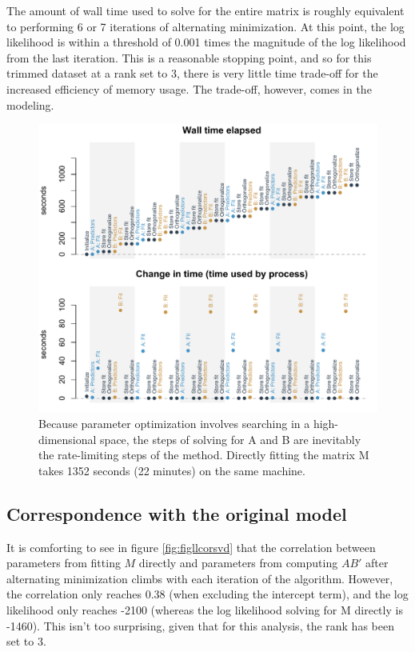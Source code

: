 \documentclass[12pt,twoside]{mitthesis-manusdown}
\begin{document}
The amount of wall time used to solve for the entire matrix is roughly
equivalent to performing 6 or 7 iterations of alternating minimization.
At this point, the log likelihood is within a threshold of 0.001 times
the magnitude of the log likelihood from the last iteration. This is a
reasonable stopping point, and so for this trimmed dataset at a rank set
to 3, there is very little time trade-off for the increased efficiency
of memory usage. The trade-off, however, comes in the modeling.
\begin{figure}[tb!]

{\centering \includegraphics[width=0.8\linewidth]{figurespred/figTimePointStore} 

}

\caption{\label{fig:figTimePointStore}Because parameter optimization involves searching in a high-dimensional space, the steps of solving for A and B are inevitably the rate-limiting steps of the method. Directly fitting the matrix M takes 1352 seconds (22 minutes) on the same machine.}\label{fig:figTimePointStore}
\end{figure}
\subsection{Correspondence with the original
model}\label{correspondence-with-the-original-model}

It is comforting to see in figure \ref{fig:figllcorsvd} that the
correlation between parameters from fitting \(M\) directly and
parameters from computing \(AB'\) after alternating minimization climbs
with each iteration of the algorithm. However, the correlation only
reaches 0.38 (when excluding the intercept term), and the log likelihood
only reaches -2100 (whereas the log likelihood solving for M directly is
-1460). This isn't too surprising, given that for this analysis, the
rank has been set to 3.
\end{document}
